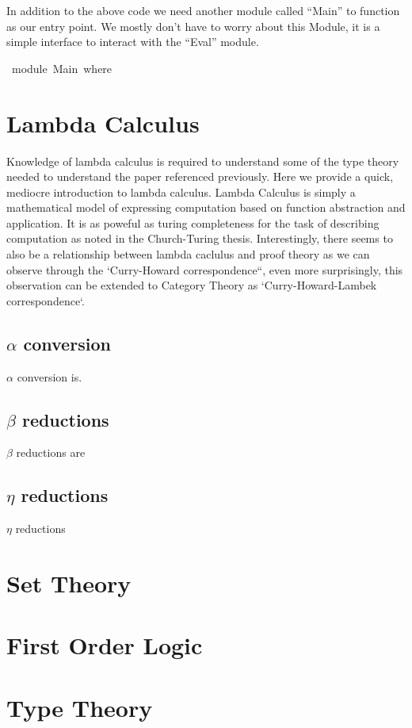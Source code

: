 \documentclass[a4paper,11pt]{article}
\begin{document}
In addition to the above code we need another module called ``Main'' to function as our entry point. We mostly don't have to worry about this Module, it is a simple interface to 
interact with the ``Eval'' module. 
\begin{tabbing}\ttfamily
~module~Main~where
\end{tabbing}

\section{Lambda Calculus}
Knowledge of lambda calculus is required to understand some of the type theory needed to understand the paper referenced previously. Here we 
provide a quick, mediocre introduction to lambda calculus. Lambda Calculus is simply a mathematical model of expressing computation based on function abstraction and application. 
It is as poweful as turing completeness for the task of describing computation as noted in the Church-Turing thesis. Interestingly, there seems to also be a relationship between lambda caclulus and proof theory 
as we can observe through the `Curry-Howard correspondence``, even more surprisingly, this observation can be extended to Category Theory as `Curry-Howard-Lambek correspondence`.

\subsection{$\alpha$ conversion}
$\alpha$ conversion is. 

\subsection{$\beta$ reductions}
$\beta$ reductions are 

\subsection{$\eta$ reductions}
$\eta$ reductions

\section{Set Theory}

\section{First Order Logic}

\section{Type Theory}
\end{document}
